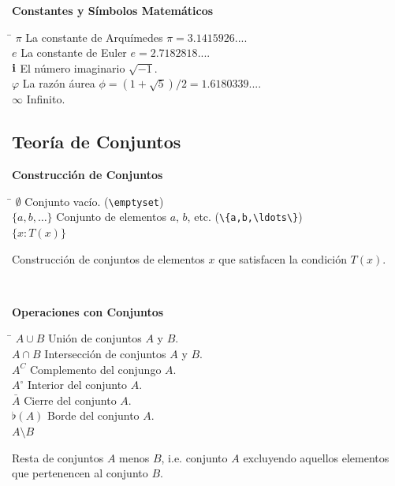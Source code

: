 \documentclass[11pt,letterpaper,twoside]{report}%
\begin{document}
{\bf Constantes y Símbolos Matemáticos}
\begin{tabbing}
\hspace{\hdiml} \= \hspace{\hdim} \kill
$\pi$    \> La constante de Arquímedes $\pi=3.1415926...$.\\[\lsk]
$e$    \> La constante de Euler $e=2.7182818...$.\\[\lsk]
$\mathbf{i}$    \> El número imaginario $\sqrt{-1}$.\\[\lsk]
$\varphi$   \> La razón áurea $\phi =  (1+\sqrt{5})/2 = 1.6180339...$.\\[\lsk]
$\infty$ \> Infinito.\\[\lsk]
\end{tabbing}


\subsection{Teoría de Conjuntos}

{\bf Construcción de Conjuntos}
\begin{tabbing}
\hspace{\hdiml} \= \hspace{\hdim} \kill
$\emptyset$    \> Conjunto vacío. (\Verb|\emptyset|)\\[\lsk]
$\{a,b,\ldots\}$ \> Conjunto de elementos $a$, $b$, etc.  (\Verb|\{a,b,\ldots\}|)\\[\lsk]
$\{x:T(x)\}$ \> \parbox[t]{\hdim}{Construcción de conjuntos de elementos $x$ que satisfacen 
                  la condición $T(x)$. %
									}\\[\lsk]
\end{tabbing}


{\bf Operaciones con Conjuntos}
\begin{tabbing}
\hspace{\hdiml} \= \hspace{\hdim} \kill
$A\cup B$         \> Unión de conjuntos $A$ y $B$.\\[\lsk]
$A\cap B$         \> Intersección de conjuntos $A$ y $B$.\\[\lsk]
$A^C$         \> Complemento del conjungo $A$.\\[\lsk]
$A^\circ$      \> Interior del conjunto $A$.\\[\lsk]
$\bar{A}$      \> Cierre del conjunto $A$.\\[\lsk]
$\flat(A)$     \> Borde del conjunto $A$.\\[\lsk]
$A\setminus B$ \> \parbox[t]{\hdim}{Resta de conjuntos $A$ menos $B$, i.e. conjunto $A$ excluyendo aquellos elementos que pertenencen al conjunto $B$.}\\[\lsk]
\end{tabbing}
\end{document}

